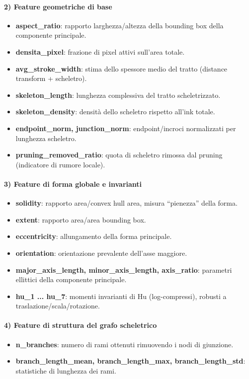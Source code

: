 \documentclass[a4paper,12pt]{article}
\begin{document}
\paragraph{2) Feature geometriche di base}
\begin{itemize}[leftmargin=1.5em]
  \item \textbf{aspect\_ratio}: rapporto larghezza/altezza della bounding box della componente principale.
  \item \textbf{densita\_pixel}: frazione di pixel attivi sull'area totale.
  \item \textbf{avg\_stroke\_width}: stima dello spessore medio del tratto (distance transform + scheletro).
  \item \textbf{skeleton\_length}: lunghezza complessiva del tratto scheletrizzato.
  \item \textbf{skeleton\_density}: densità dello scheletro rispetto all'ink totale.
  \item \textbf{endpoint\_norm, junction\_norm}: endpoint/incroci normalizzati per lunghezza scheletro.
  \item \textbf{pruning\_removed\_ratio}: quota di scheletro rimossa dal pruning (indicatore di rumore locale).
\end{itemize}

\paragraph{3) Feature di forma globale e invarianti}
\begin{itemize}[leftmargin=1.5em]
  \item \textbf{solidity}: rapporto area/convex hull area, misura ``pienezza'' della forma.
  \item \textbf{extent}: rapporto area/area bounding box.
  \item \textbf{eccentricity}: allungamento della forma principale.
  \item \textbf{orientation}: orientazione prevalente dell'asse maggiore.
  \item \textbf{major\_axis\_length, minor\_axis\_length, axis\_ratio}: parametri ellittici della componente principale.
  \item \textbf{hu\_1 ... hu\_7}: momenti invarianti di Hu (log-compressi), robusti a traslazione/scala/rotazione.
\end{itemize}

\paragraph{4) Feature di struttura del grafo scheletrico}
\begin{itemize}[leftmargin=1.5em]
  \item \textbf{n\_branches}: numero di rami ottenuti rimuovendo i nodi di giunzione.
  \item \textbf{branch\_length\_mean, branch\_length\_max, branch\_length\_std}: statistiche di lunghezza dei rami.
\end{itemize}
\end{document}

